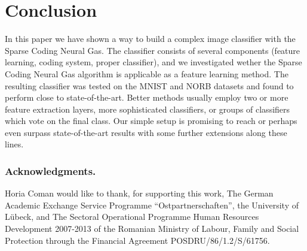 \documentclass[runningheads,a4paper]{llncs}
\begin{document}
\section{Conclusion}

In this paper we have shown a way to build a complex image classifier with the Sparse Coding Neural Gas. The classifier consists of several components (feature learning, coding system, proper classifier), and we investigated wether the Sparse Coding Neural Gas algorithm is applicable as a feature learning method. The resulting classifier was tested on the MNIST and NORB datasets and found to perform close to state-of-the-art. Better methods usually employ two or more feature extraction layers, more sophisticated classifiers, or groups of classifiers which vote on the final class. Our simple setup is promising to reach or perhaps even surpass state-of-the-art results with some further extensions along these lines.

\subsubsection*{Acknowledgments.} Horia Coman would like to thank, for supporting this work, The German Academic Exchange Service Programme ``Ostpartnerschaften'', the University of L\"{u}beck,  and The Sectoral Operational Programme Human Resources Development 2007-2013 of the Romanian Ministry of Labour, Family and Social Protection through the Financial Agreement POSDRU/86/1.2/S/61756.
\end{document}
